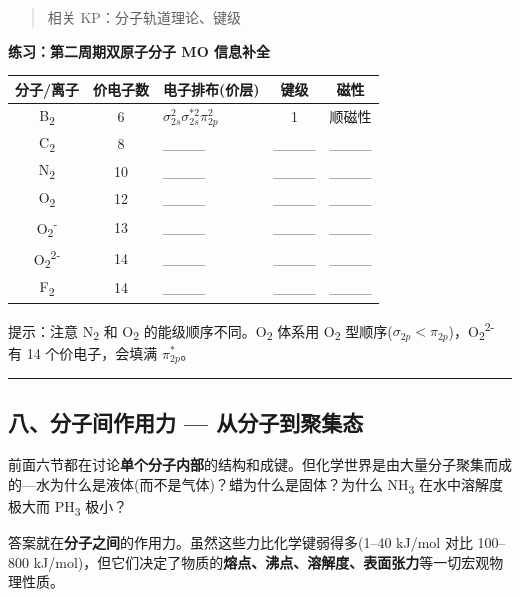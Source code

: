 \documentclass[a4paper,11pt]{ctexart}
\newcounter{none}
\newcommand{\箭}{\ensuremath{\rightarrow}}
\newcommand{\左箭}{\ensuremath{\leftarrow}}
\newcommand{\上箭}{\ensuremath{\uparrow}}
\newcommand{\下箭}{\ensuremath{\downarrow}}
\newcommand{\衡}{\ensuremath{\rightleftharpoons}}
\newcommand{\双箭}{\ensuremath{\leftrightarrow}}
\newcommand{\约等于}{\ensuremath{\approx}}
\newcommand{\小于等于}{\ensuremath{\leq}}
\newcommand{\大于等于}{\ensuremath{\geq}}
\newcommand{\不等于}{\ensuremath{\neq}}
\newcommand{\西格马}{\ensuremath{\sigma}}
\newcommand{\派}{\ensuremath{\pi}}
\begin{document}
\begin{quote}
相关 KP：分子轨道理论、键级
\end{quote}

\textbf{练习：第二周期双原子分子 MO 信息补全}

{\def\LTcaptype{none} %
\begin{longtable}[]{@{}cclcc@{}}
\toprule\noalign{}
分子/离子 & 价电子数 & 电子排布(价层) & 键级 & 磁性 \\
\midrule\noalign{}
\endhead
\bottomrule\noalign{}
\endlastfoot
B\textsubscript{2} & 6 & \(\sigma_{2s}^2 \sigma_{2s}^{*2} \pi_{2p}^2\) & 1 & 顺磁性 \\
C\textsubscript{2} & 8 & \_\_\_\_ & \_\_\_\_ & \_\_\_\_ \\
N\textsubscript{2} & 10 & \_\_\_\_ & \_\_\_\_ & \_\_\_\_ \\
O\textsubscript{2} & 12 & \_\_\_\_ & \_\_\_\_ & \_\_\_\_ \\
O\textsubscript{2}\textsuperscript{-} & 13 & \_\_\_\_ & \_\_\_\_ & \_\_\_\_ \\
O\textsubscript{2}\textsuperscript{2-} & 14 & \_\_\_\_ & \_\_\_\_ & \_\_\_\_ \\
F\textsubscript{2} & 14 & \_\_\_\_ & \_\_\_\_ & \_\_\_\_ \\
\end{longtable}
}

提示：注意 N\textsubscript{2} 和 O\textsubscript{2} 的能级顺序不同。O\textsubscript{2} 体系用 O\textsubscript{2} 型顺序(\(\sigma_{2p}<\pi_{2p}\))，O\textsubscript{2}\textsuperscript{2-} 有 14 个价电子，会填满 \(\pi_{2p}^*\)。

\begin{center}\rule{0.5\linewidth}{0.5pt}\end{center}

\subsection{八、分子间作用力 --- 从分子到聚集态}\label{ux516bux5206ux5b50ux95f4ux4f5cux7528ux529b-ux4eceux5206ux5b50ux5230ux805aux96c6ux6001}

前面六节都在讨论\textbf{单个分子内部}的结构和成键。但化学世界是由大量分子聚集而成的---水为什么是液体(而不是气体)？蜡为什么是固体？为什么 NH\textsubscript{3} 在水中溶解度极大而 PH\textsubscript{3} 极小？

答案就在\textbf{分子之间}的作用力。虽然这些力比化学键弱得多(1--40 kJ/mol 对比 100--800 kJ/mol)，但它们决定了物质的\textbf{熔点、沸点、溶解度、表面张力}等一切宏观物理性质。
\end{document}
